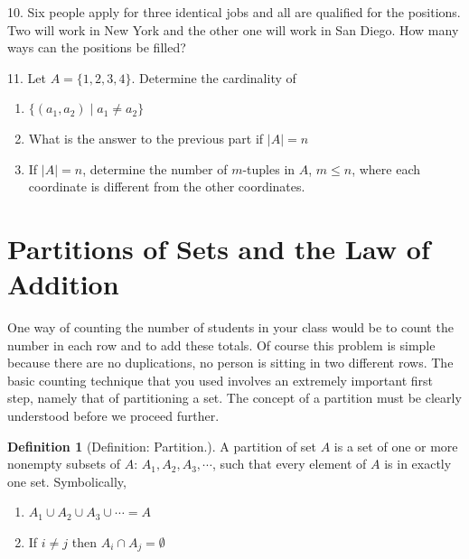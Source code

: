 \documentclass[10pt,]{book}
\theoremstyle{plain}
\theoremstyle{definition}
\newtheorem{definition}[theorem]{Definition}
\begin{document}
\hypertarget{exercisegroup-13}{}\begin{exercisegroup}
\item[10.]\hypertarget{exercise-71}{} Six people apply for three identical jobs and all are qualified for the positions. Two will work in New York and the other one will work in San Diego. How many ways can the positions be filled?\par\smallskip
\item[11.]\hypertarget{exercise-72}{}
 Let \(A = \{1, 2, 3, 4\} \). Determine the cardinality of
 \leavevmode%
\begin{enumerate}[label=(\alph*)]
\item\hypertarget{li-217}{}\(\{ (a_1,a_2) \mid a_1 \neq a_2 \}\)\item\hypertarget{li-218}{}What is the answer to the previous part if \(\lvert A \rvert = n\)\item\hypertarget{li-219}{}If \(\lvert A \rvert =n\), determine the number of \(m\)-tuples in \(A\), \(m \leq n\), where each coordinate is different from the other coordinates.\end{enumerate}
\par\smallskip
\end{exercisegroup}
\par\smallskip\noindent
\typeout{************************************************}
\typeout{************************************************}
\section[Partitions of Sets and the Law of Addition]{Partitions of Sets and the Law of Addition}\label{Partitions-and-Law-of-Addition}

 One way of counting the number of students in your class would be to count the number in each row and to add these totals. Of course this problem is simple because there are no duplications, no person is sitting in two different rows. The basic counting technique that you used involves an extremely important first step, namely that of partitioning a set. The concept of a partition must be clearly understood before we proceed further.
%
\begin{definition}[Definition: Partition.]\label{partition}
 A partition of set \(A\) is a set of one or more nonempty subsets of \(A\): \(A_1, A_2, A_3, \cdots\), such that every element of \(A\) is in exactly one set.  Symbolically, 
\leavevmode%
\begin{enumerate}
\item\hypertarget{li-220}{}\(A_1 \cup A_2 \cup A_3 \cup \cdots = A\)\item\hypertarget{li-221}{}If  \(i \neq j\) then \(A_i \cap A_j = \emptyset\)\end{enumerate}
\end{definition}
\par
\end{document}
